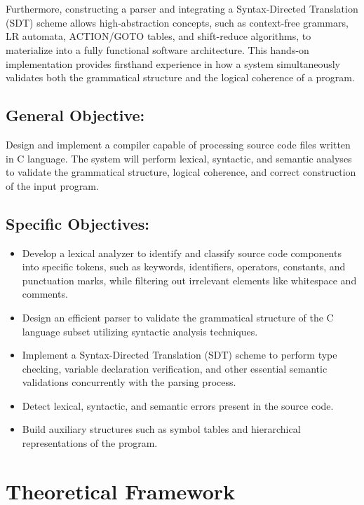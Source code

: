\documentclass[letterpaper,12pt,oneside]{article}
\begin{document}
    \\ \\
    Furthermore, constructing a parser and integrating a Syntax-Directed Translation (SDT) scheme allows high-abstraction concepts, such as context-free grammars, LR automata, ACTION/GOTO tables, and shift-reduce algorithms, to materialize into a fully functional software architecture. This hands-on implementation provides firsthand experience in how a system simultaneously validates both the grammatical structure and the logical coherence of a program.
    \noindent\subsection*{General Objective:}
    Design and implement a compiler capable of processing source code files written in C language. The system will perform lexical, syntactic, and semantic analyses to validate the grammatical structure, logical coherence, and correct construction of the input program.
    \noindent\subsection*{Specific Objectives:}
    \begin{itemize}
        \item Develop a lexical analyzer to identify and classify source code components into specific tokens, such as keywords, identifiers, operators, constants, and punctuation marks, while filtering out irrelevant elements like whitespace and comments.
        \item Design an efficient parser to validate the grammatical structure of the C language subset utilizing syntactic analysis techniques.
        \item Implement a Syntax-Directed Translation (SDT) scheme to perform type checking, variable declaration verification, and other essential semantic validations concurrently with the parsing process.
        \item Detect lexical, syntactic, and semantic errors present in the source code.
        \item Build auxiliary structures such as symbol tables and hierarchical representations of the program.
    \end{itemize}

\section{Theoretical Framework}

\end{document}
